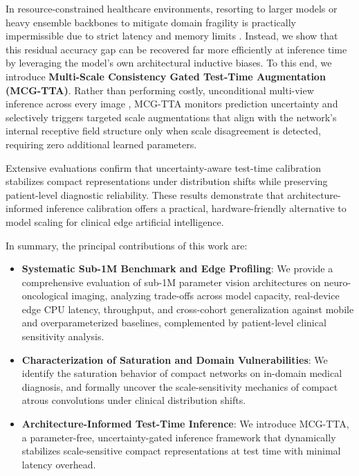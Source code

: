 In resource-constrained healthcare environments, resorting to larger models or heavy ensemble backbones to mitigate domain fragility is practically impermissible due to strict latency and memory limits \cite{9, 16}. Instead, we show that this residual accuracy gap can be recovered far more efficiently at inference time by leveraging the model's own architectural inductive biases. To this end, we introduce \textbf{Multi-Scale Consistency Gated Test-Time Augmentation (MCG-TTA)}. Rather than performing costly, unconditional multi-view inference across every image \cite{4, 35}, MCG-TTA monitors prediction uncertainty and selectively triggers targeted scale augmentations that align with the network's internal receptive field structure only when scale disagreement is detected, requiring zero additional learned parameters.

Extensive evaluations confirm that uncertainty-aware test-time calibration stabilizes compact representations under distribution shifts while preserving patient-level diagnostic reliability. These results demonstrate that architecture-informed inference calibration offers a practical, hardware-friendly alternative to model scaling for clinical edge artificial intelligence.

In summary, the principal contributions of this work are:
\begin{itemize}
\item \textbf{Systematic Sub-1M Benchmark and Edge Profiling}: We provide a comprehensive evaluation of sub-1M parameter vision architectures on neuro-oncological imaging, analyzing trade-offs across model capacity, real-device edge CPU latency, throughput, and cross-cohort generalization against mobile and overparameterized baselines, complemented by patient-level clinical sensitivity analysis.
\item \textbf{Characterization of Saturation and Domain Vulnerabilities}: We identify the saturation behavior of compact networks on in-domain medical diagnosis, and formally uncover the scale-sensitivity mechanics of compact atrous convolutions under clinical distribution shifts.
\item \textbf{Architecture-Informed Test-Time Inference}: We introduce MCG-TTA, a parameter-free, uncertainty-gated inference framework that dynamically stabilizes scale-sensitive compact representations at test time with minimal latency overhead.
\end{itemize}
